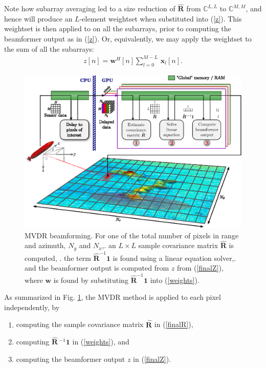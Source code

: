 \documentclass[
a4paper,10pt
]{common/ica2013_2}
\newcommand\sumb[2]{\sum\limits_{#1}^{#2}\,}
\renewcommand\H{^{\scriptscriptstyle H}}
\renewcommand\vec[1]{\boldsymbol{#1}}
\newcommand\mat[1]{\boldsymbol{#1}}
\newcommand\1{\vec 1}
\newcommand*\w{\vec w}
\newcommand*\x{\vec x}
\newcommand*\eR{\mat{\hat R}}
\newcommand*\eRi{\hat{\mat R}\,\!^{-1}}
\begin{document}
Note how subarray averaging led to a size reduction of $\eR$ from $\mathbb{C}^{L,L}$ to $\mathbb{C}^{M,M}$, and hence will produce an $L$-element weightset when substituted into (\ref{z}). This weightset is then applied to on all the subarrays, prior to computing the beamformer output as in (\ref{z}). Or, equivalently, we may apply the weightset to the sum of all the subarrays:
\begin{align}
z[n] = \w\H[n] \sumb{l=0}{M-L} \x_l[n].\label{finalZ}
\end{align}
\begin{figure}[!t]\centering
\includegraphics[width=\linewidth]{gfx/implementation.eps}
\caption{MVDR beamforming. For one of the total number of pixels in range and azimuth, $N_y$ and $N_x$,. an $L\times{}L$ sample covariance matrix $\eR$ is computed, . the term $\eR^{-1}\1$ is found using a linear equation solver,. and the beamformer output is computed from $z$ from (\ref{finalZ}), where $\w$ is found by substituting $\eR^{-1}\1$ into (\ref{weights}). } \label{mvdr_beamforming}
\end{figure}
As summarized in Fig. \ref{mvdr_beamforming}, the MVDR method is applied to each pixel independently, by
\begin{enumerate}
\item computing the sample covariance matrix $\eR$ in (\ref{finalR}),
\item computing $\eRi\1$ in (\ref{weights}), and
\item computing the beamformer output $z$ in (\ref{finalZ}).
\end{enumerate}
\end{document}
